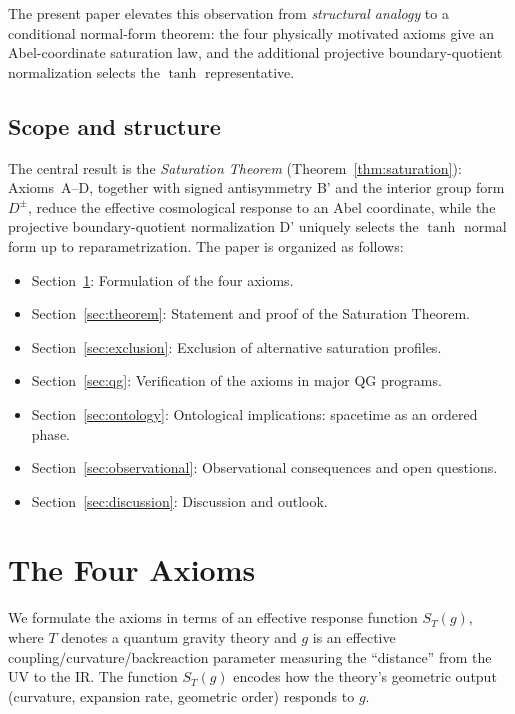 \documentclass[aps,prd,twocolumn,superscriptaddress,nofootinbib]{revtex4-2}
\begin{document}
The present paper elevates this observation from \textit{structural analogy} to a conditional normal-form theorem: the four physically motivated axioms give an Abel-coordinate saturation law, and the additional projective boundary-quotient normalization selects the $\tanh$ representative.

\subsection{Scope and structure}

The central result is the \textit{Saturation Theorem} (Theorem~\ref{thm:saturation}): Axioms~A--D, together with signed antisymmetry B' and the interior group form $D^\pm$, reduce the effective cosmological response to an Abel coordinate, while the projective boundary-quotient normalization D' uniquely selects the $\tanh$ normal form up to reparametrization. The paper is organized as follows:

\begin{itemize}
\item Section~\ref{sec:axioms}: Formulation of the four axioms.
\item Section~\ref{sec:theorem}: Statement and proof of the Saturation Theorem.
\item Section~\ref{sec:exclusion}: Exclusion of alternative saturation profiles.
\item Section~\ref{sec:qg}: Verification of the axioms in major QG programs.
\item Section~\ref{sec:ontology}: Ontological implications: spacetime as an ordered phase.
\item Section~\ref{sec:observational}: Observational consequences and open questions.
\item Section~\ref{sec:discussion}: Discussion and outlook.
\end{itemize}


\section{The Four Axioms}
\label{sec:axioms}

We formulate the axioms in terms of an effective response function $S_T(g)$, where $T$ denotes a quantum gravity theory and $g$ is an effective coupling/curvature/backreaction parameter measuring the ``distance'' from the UV to the IR. The function $S_T(g)$ encodes how the theory's geometric output (curvature, expansion rate, geometric order) responds to $g$.
\end{document}
